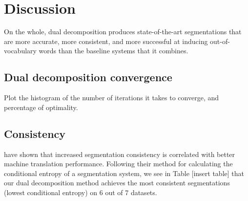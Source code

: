 \section{Discussion}


On the whole, dual decomposition produces state-of-the-art segmentations that are more accurate, more consistent, and more successful at inducing out-of-vocabulary words than the baseline systems that it combines.

\subsection{Dual decomposition convergence}
Plot the histogram of the number of iterations it takes to converge, and percentage of optimality. 

\subsection{Consistency}

\cite{Chang:2008:ACL} have shown that increased segmentation consistency is correlated with better machine translation performance. Following their method for calculating the conditional entropy of a segmentation system, we see in Table [insert table] that our dual decomposition method achieves the most consistent segmentations (lowest conditional entropy) on 6 out of 7 datasets.


